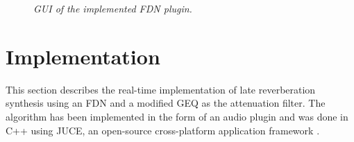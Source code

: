 \documentclass[twoside,a4paper]{article}
\begin{document}
\begin{figure}[ht!]
    \centering
     \hfill
     \hfill
    \caption{\textit{GUI of the implemented FDN plugin.}}
    \label{fig:GUIboth}
\end{figure}


\section{Implementation}

This section describes the real-time implementation of late reverberation synthesis using an FDN and a modified GEQ as the attenuation filter. The algorithm has been implemented in the form of an audio plugin and was done in C++ using JUCE, an open-source cross-platform application framework \cite{juce}.
\end{document}
